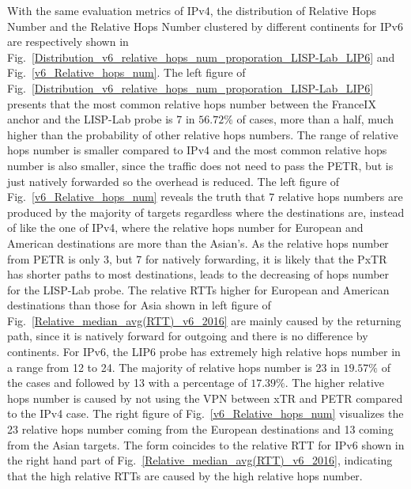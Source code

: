 With the same evaluation metrics of IPv4, the distribution of Relative Hops Number and the Relative Hops Number clustered by different continents for IPv6 are respectively shown in Fig.~\ref{Distribution_v6_relative_hops_num_proporation_LISP-Lab_LIP6} and Fig.~\ref{v6_Relative_hops_num}. The left figure of Fig.~\ref{Distribution_v6_relative_hops_num_proporation_LISP-Lab_LIP6} presents that the most common relative hops number between the FranceIX anchor and the LISP-Lab probe is 7 in $56.72\%$ of cases, more than a half, much higher than the probability of other relative hops numbers. The range of relative hops number is smaller compared to IPv4 and the most common relative hops number is also smaller, since the traffic does not need to pass the PETR, but is just natively forwarded so the overhead is reduced. The left figure of Fig.~\ref{v6_Relative_hops_num} reveals the truth that 7 relative hops numbers are produced by the majority of targets regardless where the destinations are, instead of like the one of IPv4, where the relative hops number for European and American destinations are more than the Asian's. As the relative hops number from PETR is only 3, but 7 for natively forwarding, it is likely that the PxTR has shorter paths to most destinations, leads to the decreasing of hops number for the LISP-Lab probe. The relative RTTs higher for European and American destinations than those for Asia shown in left figure of Fig.~\ref{Relative_median_avg(RTT)_v6_2016} are mainly caused by the returning path, since it is natively forward for outgoing and there is no difference by continents. For IPv6, the LIP6 probe has extremely high relative hops number in a range from 12 to 24. The majority of relative hops number is 23 in $19.57\%$ of the cases and followed by 13 with a percentage of $17.39\%$. The higher relative hops number is caused by not using the VPN between xTR and PETR compared to the IPv4 case. The right figure of Fig.~\ref{v6_Relative_hops_num} visualizes the 23 relative hops number coming from the European destinations and 13 coming from the Asian targets. The form coincides to the relative RTT for IPv6 shown in the right hand part of Fig.~\ref{Relative_median_avg(RTT)_v6_2016}, indicating that the high relative RTTs are caused by the high relative hops number. 

